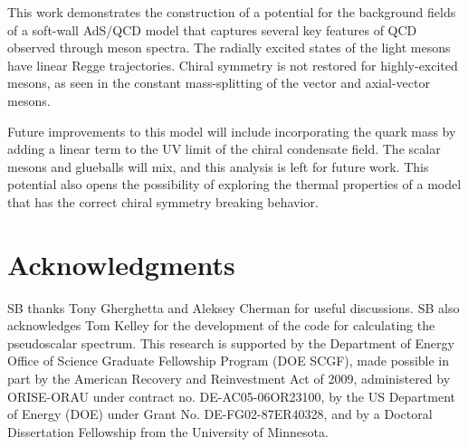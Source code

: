 \documentclass[aps,prd,12pt,nofootinbib]{revtex4}
\begin{document}
This work demonstrates the construction of a potential for the background fields of a soft-wall AdS/QCD model that captures several key features of QCD observed through meson spectra.
The radially excited states of the light mesons have linear Regge trajectories.
Chiral symmetry is not restored for highly-excited mesons, as seen in the constant mass-splitting of the vector and axial-vector mesons.

Future improvements to this model will include incorporating the quark mass by adding a linear term to the UV limit of the chiral condensate field.
The scalar mesons and glueballs will mix, and this analysis is left for future work.
This potential also opens the possibility of exploring the thermal properties of a model that has the correct chiral symmetry breaking behavior.


\section*{Acknowledgments}
SB thanks Tony Gherghetta and Aleksey Cherman for useful discussions.  
SB also acknowledges Tom Kelley for the development of the code for calculating the pseudoscalar spectrum.
This research is supported by the Department of Energy Office of Science Graduate Fellowship Program (DOE SCGF), made possible in part by the American Recovery and Reinvestment Act of 2009, administered by ORISE-ORAU under contract no. DE-AC05-06OR23100, by the US Department of Energy (DOE) under Grant No. DE-FG02-87ER40328, and by a Doctoral Dissertation Fellowship from the University of Minnesota.

\vfill
\end{document}

